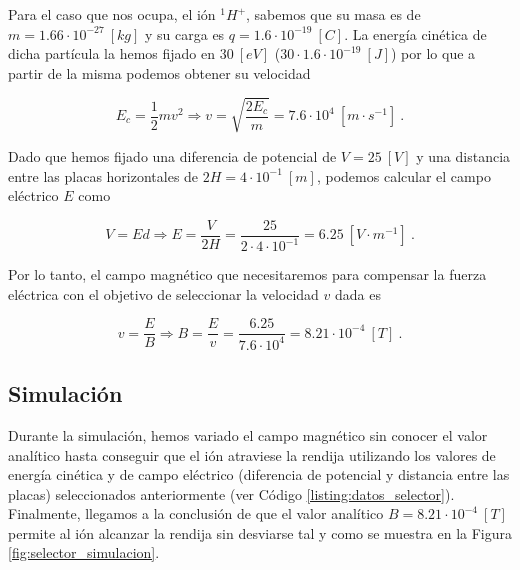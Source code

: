 \documentclass[journal]{IEEEtran}
\begin{document}
Para el caso que nos ocupa, el ión $^1H^+$, sabemos que su masa es de $m = 1.66\cdot 10^{-27}~[kg]$ y su carga es $q = 1.6 \cdot 10^{-19}~[C]$. La energía cinética de dicha partícula la hemos fijado en $30~[eV]$ ($30\cdot 1.6\cdot 10^{-19}~[J]$) por lo que a partir de la misma podemos obtener su velocidad

\begin{equation}
    E_c = \displaystyle\frac{1}{2}mv^2 \Rightarrow v = \sqrt{\displaystyle\frac{2E_c}{m}} = 7.6\cdot 10^4~[m\cdot s^{-1}]~.
\end{equation}

Dado que hemos fijado una diferencia de potencial de $V = 25~[V]$ y una distancia entre las placas horizontales de $2H = 4\cdot 10^{-1}~[m]$, podemos calcular el campo eléctrico $E$ como

\begin{equation}
    V = Ed \Rightarrow E = \displaystyle\frac{V}{2H} = \displaystyle\frac{25}{2\cdot 4\cdot 10^{-1}} = 6.25~[V\cdot m^{-1}]~.
\end{equation}

Por lo tanto, el campo magnético que necesitaremos para compensar la fuerza eléctrica con el objetivo de seleccionar la velocidad $v$ dada es

\begin{equation}
    v = \displaystyle\frac{E}{B} \Rightarrow B = \displaystyle\frac{E}{v} = \displaystyle\frac{6.25}{7.6\cdot 10^4} = 8.21 \cdot 10^{-4}~[T]~.
\end{equation}

\subsection{Simulación}

Durante la simulación, hemos variado el campo magnético sin conocer el valor analítico hasta conseguir que el ión atraviese la rendija utilizando los valores de energía cinética y de campo eléctrico (diferencia de potencial y distancia entre las placas) seleccionados anteriormente (ver Código \ref{listing:datos_selector}). Finalmente, llegamos a la conclusión de que el valor analítico $B = 8.21\cdot 10^{-4}~[T]$ permite al ión alcanzar la rendija sin desviarse tal y como se muestra en la Figura \ref{fig:selector_simulacion}.

\newpage
\end{document}
